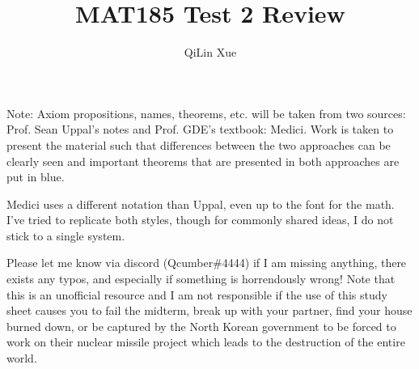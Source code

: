 \documentclass{article}
\title{MAT185 Test 2 Review}
\author{QiLin Xue}
\begin{document}
    \maketitle
    \tableofcontents
    Note: Axiom propositions, names, theorems, etc. will be taken from two sources: Prof. Sean Uppal's notes and Prof. GDE's textbook: Medici. Work is taken to present the material such that differences between the two approaches can be clearly seen and important theorems that are presented in both approaches are put in blue.
    \vspace{2mm}

    Medici uses a different notation than Uppal, even up to the font for the math. I've tried to replicate both styles, though for commonly shared ideas, I do not stick to a single system.
    \vspace{2mm}

    Please let me know via discord (Qcumber\#4444) if I am missing anything, there exists any typos, and especially if something is horrendously wrong! Note that this is an unofficial resource and I am not responsible if the use of this study sheet causes you to fail the midterm, break up with your partner, find your house burned down, or be captured by the North Korean government to be forced to work on their nuclear missile project which leads to the destruction of the entire world.
\end{document}
